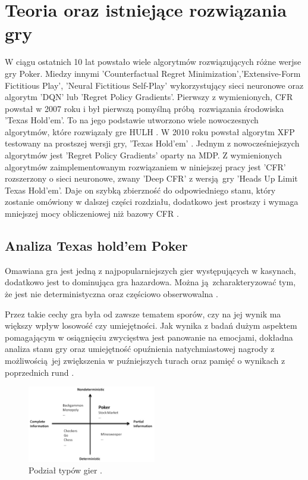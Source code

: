 \documentclass[12pt,oneside,a4paper]{report}
\begin{document}
\section{Teoria oraz istniejące rozwiązania gry}

W ciągu ostatnich 10 lat powstało wiele algorytmów rozwiązujących różne werjse gry Poker.
Miedzy innymi 'Counterfactual Regret Minimization','Extensive-Form Fictitious Play', 
'Neural Fictitious Self-Play' wykorzystujący sieci neuronowe  oraz algorytm 'DQN' lub
'Regret Policy Gradients'. Pierwszy z wymienionych, CFR powstał w 2007 roku i był pierwszą 
pomyślną próbą rozwiązania środowiska 'Texas Hold'em'. To na jego podstawie utworzono wiele nowoczesnych
algorytmów, które rozwiązały gre HULH \cite{eq}. W 2010 roku powstał algorytm XFP testowany na 
prostszej wersji gry, 'Texas Hold'em' \cite{FSEG}. Jednym z nowocześniejszych algorytmów jest
'Regret Policy Gradients' oparty na MDP.
Z wymienionych algorytmów zaimplementowanym rozwiązaniem w niniejszej pracy jest 'CFR' 
rozszerzony o sieci neuronowe,
zwany 'Deep CFR' z wersją gry 'Heads Up Limit Texas Hold'em'. Daje on szybką zbierzność do odpowiedniego stanu, który zostanie omówiony w
dalszej części rozdziału, dodatkowo jest prostszy i wymaga mniejszej mocy obliczeniowej niż bazowy 
CFR \cite{dcfr}.

\subsection{Analiza Texas hold'em Poker}

Omawiana gra jest jedną z najpopularniejszych gier występujących w kasynach, dodatkowo jest to
dominująca gra hazardowa. Można ją zcharakteryzować tym, że jest nie deterministyczna oraz częściowo 
obserwowalna \cite{sp}.  


Przez takie cechy gra była od zawsze tematem sporów, czy na jej wynik ma większy wpływ
losowość czy umiejętności. Jak wynika z badań dużym aspektem pomagającym w osiągnięciu zwycięstwa 
jest panowanie na emocjami, dokładna analiza stanu gry oraz umiejętność opuźnienia natychmiastowej
nagrody z możliwością jej zwiększenia w puźniejszych turach oraz pamięć o wynikach z poprzednich 
rund \cite{gm}. 
\begin{figure}[h!]
            \center
           \includegraphics[width=0.5\textwidth]{./img/classification.pdf}
           \caption{Podział typów gier \cite{sp}.}
\end{figure}
\end{document}
